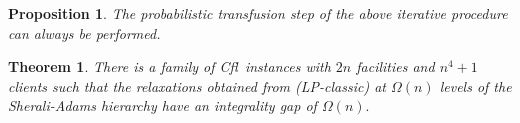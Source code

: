 \documentclass[11pt]{article}
\newtheorem{theorem}{Theorem}[section]
\newtheorem{proposition}{Proposition}[section]
\newcommand{\qed}{\hfill \mbox{\raggedright \rule{2mm}{3mm}}}
\newenvironment{proof}{\noindent{\bf Proof.}}{\qed}
\newcommand{\cfl}{{\sc Cfl}}
\begin{document}
\vspace*{-0.1cm}
\begin{proposition}\label{transf:prop}
The probabilistic transfusion step of the above iterative procedure can always be performed.
\end{proposition}
\vspace*{-0.5cm}
\begin{comment}
\begin{proof}
Consider the measure $t$ in $E_d$ of the set of integer solution satisfying  $y_{i_b}=1$ 
and all events in $\mathcal{E}_p$ being false, namely $x_{i_bj}=0
\wedge x_{i_1j_1}=0 \wedge x_{i_2j_2}=0 \wedge \ldots \wedge x_{i_{k-i+1}j_{k-i+1}}=0 $. Then, by the random experiment of the construction of $E_d$, this event is equivalent to the event that facility $i_b$ is picked, $x_{i_bj}=0$ and  the $k-i+1$ balls corresponding to the clients of the rest of events
are not tossed in their corresponding bins. Using again that both $w^1_{ch},w^2_{ch}$ are $\Theta (n^3)$ and $k-i+1<n$, we can bound the probability of the $k-i+1$ balls  by that of $k-i+1$ Bernoulli trials with probability of success $2/n$ (we are once again very generous). Then the probability that all events on ball $j_i$  fail is $> (1-2/n)^{k-i+1}> \lim_{n \rightarrow \infty }(1-2/n)^n = 1/e^2$. Thus measure $t$ is at least $(y_{i_{b}}-x_{i_bj}) 1/e^2$ which is constant. On the other hand the measure required by the transfusion step for each event $\mathcal{E}_{p}$ of iteration $i$ that needs to be fixed is at most $(e^2-1)P[\mathcal{E}_{p/fixed}]=\Theta (1/n^i)$. There are $k+1\choose{k-i+1}$ such events of iteration $i$, and summing over all the iterations of our construction we get $\sum_{i=1}^{k} {k+1\choose k-i+1} \Theta (1/n^i) $ which quantity is less than $(y_{i_{b}}-x_{i_bj}) 1/e^2$ for the $k=n/10$ levels of SA we consider, so we can always pick the required amount of measure. 
\end{proof}
\end{comment}


\begin{theorem}\label{cfl-SA:theorem}
There is  a family of   \cfl\  instances with $2n$ facilities and $n^4+1$ clients  
such that the  relaxations   obtained   from
(LP-classic)    at $\Omega(n)$ levels of the 
Sherali-Adams  hierarchy have an  integrality gap of $\Omega(n).$
\end{theorem}
\end{document}
